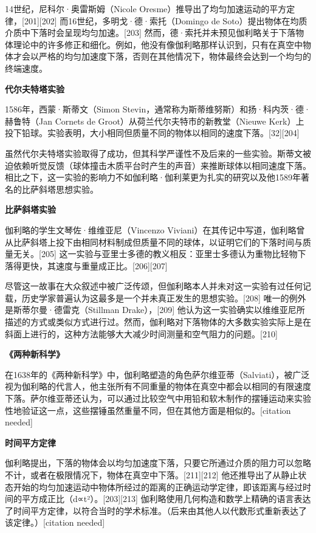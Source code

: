 14世纪，尼科尔·奥雷斯姆（Nicole Oresme）推导出了均匀加速运动的平方定律，[201][202] 而16世纪，多明戈·德·索托（Domingo de Soto）提出物体在均质介质中下落时会呈现均匀加速。[203] 然而，德·索托并未预见伽利略关于下落物体理论中的许多修正和细化。例如，他没有像伽利略那样认识到，只有在真空中物体才会以严格的均匀加速度下落，否则在其他情况下，物体最终会达到一个均匀的终端速度。

\textbf{代尔夫特塔实验 } 

1586年，西蒙·斯蒂文（Simon Stevin，通常称为斯蒂维努斯）和扬·科内茨·德·赫鲁特（Jan Cornets de Groot）从荷兰代尔夫特市的新教堂（Nieuwe Kerk）上投下铅球。实验表明，大小相同但质量不同的物体以相同的速度下落。[32][204]  

虽然代尔夫特塔实验取得了成功，但其科学严谨性不及后来的一些实验。斯蒂文被迫依赖听觉反馈（球体撞击木质平台时产生的声音）来推断球体以相同速度下落。相比之下，这一实验的影响力不如伽利略·伽利莱更为扎实的研究以及他1589年著名的比萨斜塔思想实验。

\textbf{比萨斜塔实验}

伽利略的学生文琴佐·维维亚尼（Vincenzo Viviani）在其传记中写道，伽利略曾从比萨斜塔上投下由相同材料制成但质量不同的球体，以证明它们的下落时间与质量无关。[205] 这一实验与亚里士多德的教义相反：亚里士多德认为重物比轻物下落得更快，其速度与重量成正比。[206][207]  

尽管这一故事在大众叙述中被广泛传颂，但伽利略本人并未对这一实验有过任何记载，历史学家普遍认为这最多是一个并未真正发生的思想实验。[208] 唯一的例外是斯蒂尔曼·德雷克（Stillman Drake），[209] 他认为这一实验确实以维维亚尼所描述的方式或类似方式进行过。然而，伽利略对下落物体的大多数实验实际上是在斜面上进行的，这种方法能够大大减少时间测量和空气阻力的问题。[210]

\textbf{《两种新科学》} 

在1638年的《两种新科学》中，伽利略塑造的角色萨尔维亚蒂（Salviati），被广泛视为伽利略的代言人，他主张所有不同重量的物体在真空中都会以相同的有限速度下落。萨尔维亚蒂还认为，可以通过比较空气中用铅和软木制作的摆锤运动来实验性地验证这一点，这些摆锤虽然重量不同，但在其他方面是相似的。[citation needed]  

\textbf{时间平方定律}  

伽利略提出，下落的物体会以均匀加速度下落，只要它所通过介质的阻力可以忽略不计，或者在极限情况下，物体在真空中下落。[211][212] 他还推导出了从静止状态开始的均匀加速运动中物体所经过的距离的正确运动学定律，即该距离与经过时间的平方成正比（d∝t²）。[203][213] 伽利略使用几何构造和数学上精确的语言表达了时间平方定律，以符合当时的学术标准。（后来由其他人以代数形式重新表达了该定律。）[citation needed]

